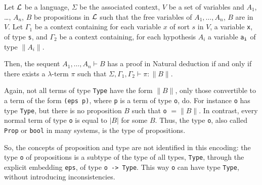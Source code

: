 \documentclass[english]{lipics}
\newcommand\lst[1]{{\rm \lstinline{#1}}}
\begin{document}


\begin{theorem}
\label{theoremconstructive}
Let ${\cal L}$ be a language, $\Sigma$ be
the associated context, $V$ be a set of variables and $A_1$, \ldots,
$A_n$, $B$ be propositions in ${\cal L}$ such that the free variables
of $A_1, \ldots, A_n$, $B$ are in $V$.  Let $\Gamma_1$ be a context
containing for each variable $x$ of sort $s$ in $V$, a variable
\lst{x}, of type \lst{s}, and $\Gamma_2$ be a context containing, for
each hypothesis $A_i$ a variable \lst{a}$_{\tt i}$ of type $\|A_i\|$.

Then, the sequent
$A_1, \ldots, A_n \vdash B$ has a proof in Natural deduction if and only if
there exists a $\lambda$-term $\pi$ such that
$\Sigma, \Gamma_1, \Gamma_2 \vdash \pi:\|B\|$.
\end{theorem}

Again, not all terms of type \lst{Type} have the form $\|B\|$, only those
convertible to a term of the form \lst{(eps p)}, where \lst{p} is a term
of type \lst{o}, do. For instance \lst{o} has type \lst{Type}, but
there is no proposition $B$ such that \lst{o} $= \|B\|$.
In contrast, every normal term of type \lst{o} is equal to $|B|$ for some
$B$.  Thus, the type \lst{o}, also called \lst{Prop} or \lst{bool} in
many systems, is the type of propositions.

So, the concepts of proposition and type are not identified in this
encoding: the type \lst{o} of propositions is a subtype of the type of
all types, \lst{Type}, through the explicit embedding \lst{eps}, of
type \lst{o -> Type}. This way \lst{o} can have type \lst{Type},
without introducing inconsistencies.
\end{document}
